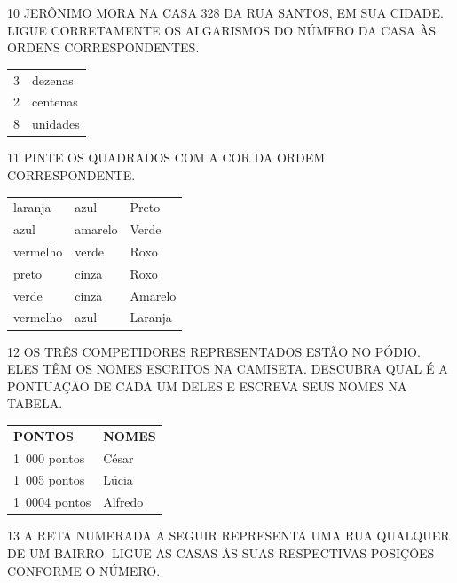 \num{10} JERÔNIMO MORA NA CASA 328 DA RUA SANTOS, EM SUA
CIDADE. LIGUE CORRETAMENTE OS ALGARISMOS DO NÚMERO DA CASA ÀS ORDENS
CORRESPONDENTES.

\begin{longtable}[]{@{}ll@{}}
\toprule
3 & dezenas\tabularnewline
2 & centenas\tabularnewline
8 & unidades\tabularnewline
\bottomrule
\end{longtable}

\num{11} PINTE OS QUADRADOS COM A COR DA ORDEM CORRESPONDENTE.



\begin{longtable}[]{@{}lll@{}}
\toprule
laranja & azul & Preto\tabularnewline
azul & amarelo & Verde\tabularnewline
vermelho & verde & Roxo\tabularnewline
preto & cinza & Roxo\tabularnewline
verde & cinza & Amarelo\tabularnewline
vermelho & azul & Laranja\tabularnewline
\bottomrule
\end{longtable}

\num{12} OS TRÊS COMPETIDORES REPRESENTADOS ESTÃO NO PÓDIO. ELES TÊM OS NOMES ESCRITOS NA CAMISETA. DESCUBRA QUAL É A PONTUAÇÃO DE CADA UM DELES E ESCREVA SEUS NOMES NA TABELA.



\begin{longtable}[]{@{}ll@{}}
\toprule
\textbf{PONTOS} & \textbf{NOMES}\tabularnewline
1~000 pontos & César\tabularnewline
1~005 pontos & Lúcia\tabularnewline
1~0004 pontos & Alfredo\tabularnewline
\bottomrule
\end{longtable}


\num{13} A RETA NUMERADA A SEGUIR REPRESENTA UMA RUA QUALQUER DE UM BAIRRO. LIGUE AS CASAS ÀS SUAS RESPECTIVAS POSIÇÕES CONFORME O NÚMERO.


